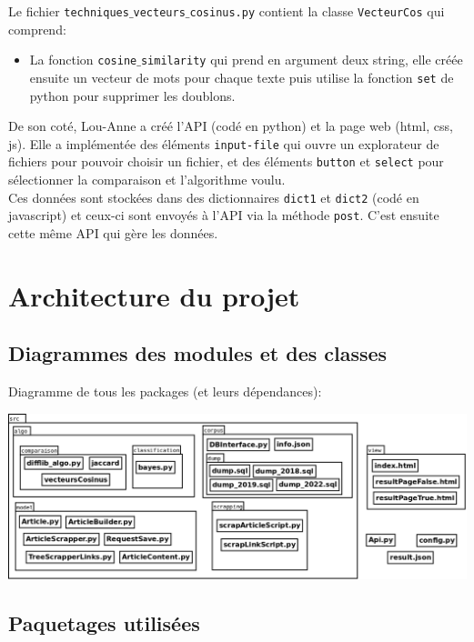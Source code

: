 \documentclass[french,12pt]{article}
\begin{document}
Le fichier \texttt{techniques$\_$vecteurs$\_$cosinus.py} contient la classe \texttt{VecteurCos} qui comprend:
\begin{itemize}
    \item La fonction \texttt{cosine$ \_$similarity} qui prend en argument deux string, elle créée ensuite un vecteur de mots pour chaque texte puis utilise la fonction \texttt{set} de python pour supprimer les doublons.\\

\end{itemize}

De son coté, Lou-Anne a créé l'API (codé en python) et la page web (html, css, js). Elle a implémentée des éléments \texttt{input-file} qui ouvre un explorateur de fichiers pour pouvoir choisir un fichier, et des éléments \texttt{button} et \texttt{select} pour sélectionner la comparaison et l'algorithme voulu. \\
Ces données sont stockées dans des dictionnaires \texttt{dict1} et \texttt{dict2} (codé en javascript) et ceux-ci sont envoyés à l'API via la méthode \texttt{post}. C'est ensuite cette même API qui gère les données.

\section{Architecture du projet} \label{architecture}

\subsection{Diagrammes des modules et des classes}

Diagramme de tous les packages (et leurs dépendances):

\begin{center}
	\includegraphics[scale=0.3]{img/DiagrammeClasse.png}	
\end{center}


\subsection{Paquetages utilisées}
\end{document}
